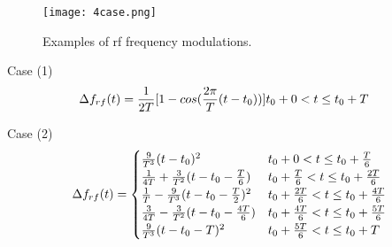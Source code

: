 %
%
%
\begin{figure}[H]
   \centering   
   \texttt{[image: 4case.png]}
   \caption{Examples of rf frequency modulations.}
   \label{4case}
\end{figure}

Case (1) 
\begin{eqnarray}
\label{case_1}
\Delta f_{rf}(t)=
\frac{1}{2T}  [1-cos(\frac{2\pi}{T}(t-t_0))] &t_0+0<t\le t_0+T\cr  
\end{eqnarray}

Case (2) 
\begin{eqnarray}\Delta f_{rf}(t)= 
\begin{cases}
\frac{9}{T^3}(t-t_0)^2 &t_0+0<t\le t_0+\frac{T}{6}\cr  
\frac{1}{4T} +\frac{3}{T^2}(t-t_0 -\frac{T}{6}) &t_0+\frac{T}{6}<t\le t_0+\frac{2T}{6}\cr 
\frac{1}{T}-\frac{9}{T^3}(t-t_0-\frac{T}{2})^2 &t_0+\frac{2T}{6}<t\le t_0+\frac{4T}{6}\cr  
\frac{3}{4T} -\frac{3}{T^2}(t-t_0 -\frac{4T}{6})  &t_0+\frac{4T}{6}<t\le t_0+\frac{5T}{6}\cr  
\frac{9}{T^3}(t-t_0-T)^2 &t_0+\frac{5T}{6}<t\le t_0+T\cr  
\end{cases}
\end{eqnarray}

